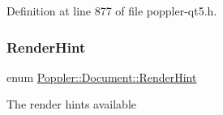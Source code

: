 Definition at line 877 of file poppler-\/qt5.\+h.

\mbox{\label{class_poppler_1_1_document_a8420ce678235ee6214fbd91f5ae2f4e9}} 
\subsubsection{\texorpdfstring{Render\+Hint}{RenderHint}}
{\footnotesize\ttfamily enum \hyperlink{class_poppler_1_1_document_a8420ce678235ee6214fbd91f5ae2f4e9}{Poppler\+::\+Document\+::\+Render\+Hint}}

The render hints available

